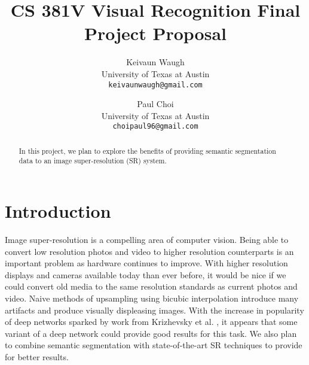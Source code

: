 \documentclass[10pt,twocolumn,letterpaper]{article}
\begin{document}
\title{CS 381V Visual Recognition Final Project Proposal}

\author{Keivaun Waugh\\
University of Texas at Austin\\
{\tt\small keivaunwaugh@gmail.com}
\and
Paul Choi\\
University of Texas at Austin\\
{\tt\small choipaul96@gmail.com}
}

\maketitle

\begin{abstract}
    In this project, we plan to explore the benefits of providing semantic segmentation data to an image super-resolution (SR) system. 
\end{abstract}

\section{Introduction}
Image super-resolution is a compelling area of computer vision. Being able to
convert low resolution photos and video to higher resolution counterparts is an
important problem as hardware continues to improve. With higher resolution
displays and cameras available today than ever before, it would be nice if we
could convert old media to the same resolution standards as current photos and
video. Naive methods of upsampling using bicubic interpolation introduce many
artifacts and produce visually displeasing images. With the increase in
popularity of deep networks sparked by work from Krizhevsky et al.
\cite{AlexNet}, it appears that some variant of a deep network could provide
good results for this task. We also plan to combine semantic segmentation with
state-of-the-art SR techniques to provide for better results.

\end{document}
